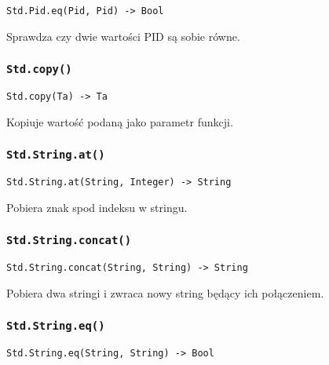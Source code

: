 \begin{small}
\begin{lstlisting}
Std.Pid.eq(Pid, Pid) -> Bool
\end{lstlisting}
\end{small}

Sprawdza czy dwie wartości PID są sobie równe.

\subsubsection{\texttt{Std.copy()}}

\begin{small}
\begin{lstlisting}
Std.copy(Ta) -> Ta
\end{lstlisting}
\end{small}

Kopiuje wartość podaną jako parametr funkcji.

\subsubsection{\texttt{Std.String.at()}}

\begin{small}
\begin{lstlisting}
Std.String.at(String, Integer) -> String
\end{lstlisting}
\end{small}

Pobiera znak spod indeksu w stringu.

\subsubsection{\texttt{Std.String.concat()}}

\begin{small}
\begin{lstlisting}
Std.String.concat(String, String) -> String
\end{lstlisting}
\end{small}

Pobiera dwa stringi i zwraca nowy string będący ich połączeniem.

\subsubsection{\texttt{Std.String.eq()}}

\begin{small}
\begin{lstlisting}
Std.String.eq(String, String) -> Bool
\end{lstlisting}
\end{small}

